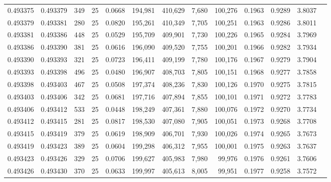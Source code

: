 \begin{tabular}{rrrrrrrrrrrrr}
0.493375 & 0.493379 &   349 &  25 &                                     0.0668 & 194,981 & 410,629 &   7,680 & 100,276 & 0.1963 & 0.9289 & 3.8037 \\
0.493379 & 0.493381 &   280 &  25 &                                     0.0820 & 195,261 & 410,349 &   7,705 & 100,251 & 0.1963 & 0.9286 & 3.8011 \\
0.493381 & 0.493386 &   448 &  25 &                                     0.0529 & 195,709 & 409,901 &   7,730 & 100,226 & 0.1965 & 0.9284 & 3.7969 \\
0.493386 & 0.493390 &   381 &  25 &                                     0.0616 & 196,090 & 409,520 &   7,755 & 100,201 & 0.1966 & 0.9282 & 3.7934 \\
0.493390 & 0.493393 &   321 &  25 &                                     0.0723 & 196,411 & 409,199 &   7,780 & 100,176 & 0.1967 & 0.9279 & 3.7904 \\
0.493393 & 0.493398 &   496 &  25 &                                     0.0480 & 196,907 & 408,703 &   7,805 & 100,151 & 0.1968 & 0.9277 & 3.7858 \\
0.493398 & 0.493403 &   467 &  25 &                                     0.0508 & 197,374 & 408,236 &   7,830 & 100,126 & 0.1970 & 0.9275 & 3.7815 \\
0.493403 & 0.493406 &   342 &  25 &                                     0.0681 & 197,716 & 407,894 &   7,855 & 100,101 & 0.1971 & 0.9272 & 3.7783 \\
0.493406 & 0.493412 &   533 &  25 &                                     0.0448 & 198,249 & 407,361 &   7,880 & 100,076 & 0.1972 & 0.9270 & 3.7734 \\
0.493412 & 0.493415 &   281 &  25 &                                     0.0817 & 198,530 & 407,080 &   7,905 & 100,051 & 0.1973 & 0.9268 & 3.7708 \\
0.493415 & 0.493419 &   379 &  25 &                                     0.0619 & 198,909 & 406,701 &   7,930 & 100,026 & 0.1974 & 0.9265 & 3.7673 \\
0.493419 & 0.493423 &   389 &  25 &                                     0.0604 & 199,298 & 406,312 &   7,955 & 100,001 & 0.1975 & 0.9263 & 3.7637 \\
0.493423 & 0.493426 &   329 &  25 &                                     0.0706 & 199,627 & 405,983 &   7,980 &  99,976 & 0.1976 & 0.9261 & 3.7606 \\
0.493426 & 0.493430 &   370 &  25 &                                     0.0633 & 199,997 & 405,613 &   8,005 &  99,951 & 0.1977 & 0.9258 & 3.7572 \\

\end{tabular}
